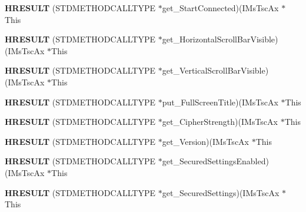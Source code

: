 \begin{DoxyCompactItemize}
\item 
\mbox{\label{struct_i_ms_tsc_ax_vtbl_a4435a65ed2d709d50fa7e49eb040ca47}} 
{\bfseries H\+R\+E\+S\+U\+LT} (S\+T\+D\+M\+E\+T\+H\+O\+D\+C\+A\+L\+L\+T\+Y\+PE $\ast$get\+\_\+\+Start\+Connected)(I\+Ms\+Tsc\+Ax $\ast$This
\item 
\mbox{\label{struct_i_ms_tsc_ax_vtbl_aad5e6fc688e645028997e52f82e54648}} 
{\bfseries H\+R\+E\+S\+U\+LT} (S\+T\+D\+M\+E\+T\+H\+O\+D\+C\+A\+L\+L\+T\+Y\+PE $\ast$get\+\_\+\+Horizontal\+Scroll\+Bar\+Visible)(I\+Ms\+Tsc\+Ax $\ast$This
\item 
\mbox{\label{struct_i_ms_tsc_ax_vtbl_ab1db9fd5de423cb1b46188e793a398e4}} 
{\bfseries H\+R\+E\+S\+U\+LT} (S\+T\+D\+M\+E\+T\+H\+O\+D\+C\+A\+L\+L\+T\+Y\+PE $\ast$get\+\_\+\+Vertical\+Scroll\+Bar\+Visible)(I\+Ms\+Tsc\+Ax $\ast$This
\item 
\mbox{\label{struct_i_ms_tsc_ax_vtbl_ab487e19fe37c47c8877f0bafeb886393}} 
{\bfseries H\+R\+E\+S\+U\+LT} (S\+T\+D\+M\+E\+T\+H\+O\+D\+C\+A\+L\+L\+T\+Y\+PE $\ast$put\+\_\+\+Full\+Screen\+Title)(I\+Ms\+Tsc\+Ax $\ast$This
\item 
\mbox{\label{struct_i_ms_tsc_ax_vtbl_a8b740cca9010400bff8fd616e14d25b2}} 
{\bfseries H\+R\+E\+S\+U\+LT} (S\+T\+D\+M\+E\+T\+H\+O\+D\+C\+A\+L\+L\+T\+Y\+PE $\ast$get\+\_\+\+Cipher\+Strength)(I\+Ms\+Tsc\+Ax $\ast$This
\item 
\mbox{\label{struct_i_ms_tsc_ax_vtbl_a49b915bbd977b04b015205b6c339c9ce}} 
{\bfseries H\+R\+E\+S\+U\+LT} (S\+T\+D\+M\+E\+T\+H\+O\+D\+C\+A\+L\+L\+T\+Y\+PE $\ast$get\+\_\+\+Version)(I\+Ms\+Tsc\+Ax $\ast$This
\item 
\mbox{\label{struct_i_ms_tsc_ax_vtbl_a9fcf13df969749aa33964d8f76907c04}} 
{\bfseries H\+R\+E\+S\+U\+LT} (S\+T\+D\+M\+E\+T\+H\+O\+D\+C\+A\+L\+L\+T\+Y\+PE $\ast$get\+\_\+\+Secured\+Settings\+Enabled)(I\+Ms\+Tsc\+Ax $\ast$This
\item 
\mbox{\label{struct_i_ms_tsc_ax_vtbl_aa84b3e5afc0d9487e16edafc7a4f9809}} 
{\bfseries H\+R\+E\+S\+U\+LT} (S\+T\+D\+M\+E\+T\+H\+O\+D\+C\+A\+L\+L\+T\+Y\+PE $\ast$get\+\_\+\+Secured\+Settings)(I\+Ms\+Tsc\+Ax $\ast$This

\end{DoxyCompactItemize}
